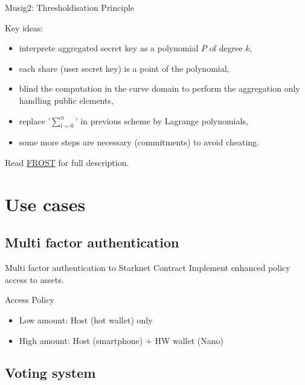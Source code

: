 \documentclass[aspectratio=43]{beamer}
\begin{document}
\begin{frame}{Musig2: Thresholdisation Principle}
{}
{
Key ideas:
\begin{itemize}
\item interprete aggregated secret key as a polynomial $P$ of degree $k$,
\item each share (user secret key) is a point of the polynomial,
\item blind the computation in the curve domain to perform the aggregation only handling public elements,
\item replace '$\sum_{i=0}^n$' in previous scheme by Lagrange polynomials,
\item some more steps are necessary (commitments) to avoid cheating.
\end{itemize}

Read \href{https://eprint.iacr.org/2020/852.pdf}{{\cyan FROST}} for full description.

}



\end{frame}  



 \section{Use cases}
 
\subsection{Multi factor authentication}
 
\begin{frame}{Multi factor authentication to Starknet Contract}
Implement enhanced policy access to assets.

\begin{exampleblock}{Access Policy}
\begin{itemize}
\item Low amount: Host (hot wallet) only
\item High amount: Host (smartphone) + HW wallet (Nano) 
\end{itemize}
\end{exampleblock}


\end{frame} 

\subsection{Voting system}
\end{document}
